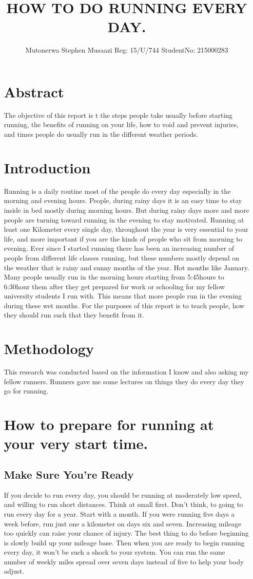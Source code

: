 \documentclass[a4paper,13pt]{article}
\begin{document}
\title{ HOW TO DO RUNNING EVERY DAY.}
\author{Mutonerwa Stephen Musaazi    Reg:  15/U/744   StudentNo:  215000283}
\maketitle
\section{Abstract}
The objective of this report is t the steps people take usually before starting running, the benefits of running on your life, how to void and prevent injuries, and times people do usually run in the different weather periods.
\section{Introduction }
{
Running is a daily routine most of the people do every day especially in the morning and evening hours. People, during rainy days it is an easy time to stay inside in bed mostly during morning hours. But during rainy days more and more people are turning toward running in the evening to stay motivated. Running at least one Kilometer every single day, throughout the year is very essential to your life, and more important if you are the kinds of people who sit from morning to evening.
Ever since I started running there has been an increasing number of people from different life classes running, but these numbers mostly depend on the weather that is rainy and sunny months of the year.
Hot months like January. Many people usually run in the morning hours starting from 5:45hours to 6:30hour them after they get prepared for work or schooling for my fellow university students I run with. This means that more people run in the evening during these wet months.
For the purposes of this report is to teach people, how they should run such that they benefit from it.}
\section{Methodology}
{This research was conducted based on the information I know and also asking my fellow runners. Runners gave me some lectures on things they do every day they go for running.}
\section{How to prepare for running at your very start time.}
\subsection{Make Sure You’re Ready}{
If you decide to run every day, you should be running at moderately low speed, and willing to run short distances. Think at small first. Don’t think, to going to run every day for a year. Start with a month. If you were running five days a week before, run just one a kilometer on days six and seven. Increasing mileage too quickly can raise your chance of injury. The best thing to do before beginning is slowly build up your mileage base. Then when you are ready to begin running every day, it won’t be such a shock to your system. You can run the same number of weekly miles spread over seven days instead of five to help your body adjust.}
\end{document}
